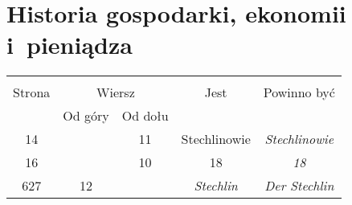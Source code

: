 \documentclass[a4paper,11pt]{article}
\begin{document}
\vspace{\spaceTwo}










\newpage
\section{Historia gospodarki, ekonomii i~pieniądza}

\vspace{\spaceTwo}





\begin{center}
  \begin{tabular}{|c|c|c|c|c|}
    \hline
    & \multicolumn{2}{c|}{} & & \\
    Strona & \multicolumn{2}{c|}{Wiersz} & Jest
                              & Powinno być \\ \cline{2-3}
    & Od góry & Od dołu & & \\
    \hline
    14  & & 11 & Stechlinowie & \emph{Stechlinowie} \\
    16  & & 10 & 18 & \emph{18} \\
    627 & 12 & & \emph{Stechlin} & \emph{Der Stechlin} \\
    \hline
  \end{tabular}
\end{center}

\vspace{\spaceTwo}









\newpage
\end{document}

